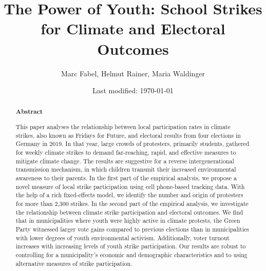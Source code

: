\documentclass[11pt, a4paper]{article} %
\title{The Power of Youth: School Strikes for Climate and Electoral Outcomes}
\author{Marc Fabel, Helmut Rainer, Maria Waldinger} %
\date{Last modified: \today}
\begin{document}
\setcounter{page}{0}  
\maketitle


\vspace{-4 em}
\renewcommand{\abstractname}{\vspace{-\baselineskip}} %

\begin{abstract}\noindent 
	\footnotesize{\begin{center}\textbf{Abstract}\end{center} This paper analyses the relationship between local participation rates in climate strikes, also known as Fridays for Future, and electoral results from four elections in Germany in 2019. In that year, large crowds of protesters, primarily students, gathered for weekly climate strikes to demand far-reaching, rapid, and effective measures to mitigate climate change.	The results are suggestive for a reverse intergenerational transmission mechanism, in which children transmit their increased environmental awareness to their parents. In the first part of the empirical analysis, we propose a novel measure of local strike participation using cell phone-based tracking data. With the help of a rich fixed-effects model, we identify the number and origin of protesters for more than 2,300 strikes. In the second part of the empirical analysis, we investigate the relationship between climate strike participation and electoral outcomes. We find that in municipalities where youth were highly active in climate protests, the Green Party witnessed larger vote gains compared to previous elections than in municipalities with lower degrees of youth environmental activism. Additionally, voter turnout increases with increasing levels of youth strike participation. Our results are robust to controlling for a municipality's economic and demographic characteristics and to using alternative measures of strike participation.}
\end{abstract}




 




\newpage
\end{document}
